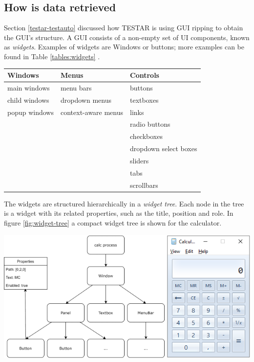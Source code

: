\subsection{How is data retrieved} \label{data-retrieval}

Section \ref{testar-testauto} discussed how TESTAR is using GUI ripping to obtain the GUI's structure. A GUI consists of a non-empty set of UI components, known as \emph{widgets}. Examples of widgets are Windows or buttons; more examples can be found in Table \ref{tables:widgets} \cite{VosAho2021}. 

\begingroup
\captionsetup{type=table}
\begin{tabularx}{\textwidth}{ 
  | >{\raggedright\arraybackslash}X 
  | >{\raggedright\arraybackslash}X 
  | >{\raggedright\arraybackslash}X | }
    \hline
    Windows & Menus & Controls \\
    \hline
    \hline
    main windows & menu bars & buttons \\
    child windows & dropdown menus & textboxes \\
    popup windows & context-aware menus & links \\
    && radio buttons \\
    && checkboxes\\
    && dropdown select boxes\\
    && sliders\\
    && tabs\\
    && scrollbars \\
    \hline
\end{tabularx}
\label{tables:widgets}
\endgroup

The widgets are structured hierarchically in a \emph{widget tree}. Each node in the tree is a widget with its related properties, such as the title, position and role. In figure \ref{fig:widget-tree} a compact widget tree is shown for the calculator. 

\bigskip
\begingroup
\captionsetup{type=figure}
\includegraphics[scale=0.7]{images/calc-tree.png}
\label{fig:widget-tree}
\endgroup


